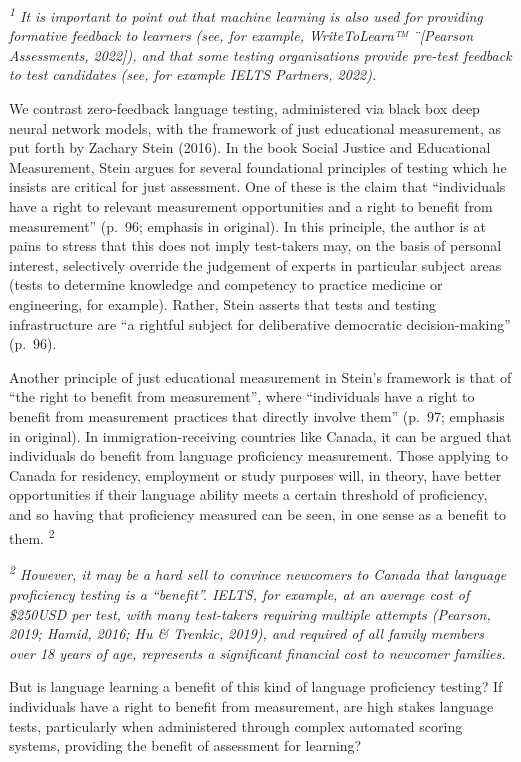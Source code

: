 \documentclass[
]{book}
\begin{document}
\emph{\textsuperscript{1} It is important to point out that machine learning is also used for providing formative feedback to learners (see, for example, WriteToLearn™ ¨{[}Pearson Assessments, 2022{]}), and that some testing organisations provide pre-test feedback to test candidates (see, for example IELTS Partners, 2022).}

We contrast zero-feedback language testing, administered via black box deep neural network models, with the framework of just educational measurement, as put forth by Zachary Stein (2016). In the book Social Justice and Educational Measurement, Stein argues for several foundational principles of testing which he insists are critical for just assessment. One of these is the claim that ``individuals have a right to relevant measurement opportunities and a right to benefit from measurement'' (p.~96; emphasis in original). In this principle, the author is at pains to stress that this does not imply test-takers may, on the basis of personal interest, selectively override the judgement of experts in particular subject areas (tests to determine knowledge and competency to practice medicine or engineering, for example). Rather, Stein asserts that tests and testing infrastructure are ``a rightful subject for deliberative democratic decision-making'' (p.~96).

Another principle of just educational measurement in Stein's framework is that of ``the right to benefit from measurement'', where ``individuals have a right to benefit from measurement practices that directly involve them'' (p.~97; emphasis in original). In immigration-receiving countries like Canada, it can be argued that individuals do benefit from language proficiency measurement. Those applying to Canada for residency, employment or study purposes will, in theory, have better opportunities if their language ability meets a certain threshold of proficiency, and so having that proficiency measured can be seen, in one sense as a benefit to them. \textsuperscript{2}

\emph{\textsuperscript{2} However, it may be a hard sell to convince newcomers to Canada that language proficiency testing is a ``benefit''. IELTS, for example, at an average cost of \$250USD per test, with many test-takers requiring multiple attempts (Pearson, 2019; Hamid, 2016; Hu \& Trenkic, 2019), and required of all family members over 18 years of age, represents a significant financial cost to newcomer families.}

But is language learning a benefit of this kind of language proficiency testing? If individuals have a right to benefit from measurement, are high stakes language tests, particularly when administered through complex automated scoring systems, providing the benefit of assessment for learning?
\end{document}
